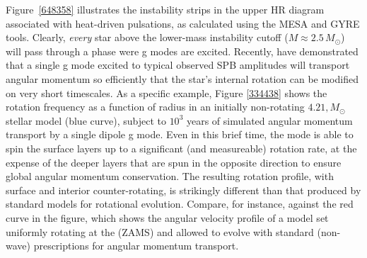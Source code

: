 Figure~\ref{648358} illustrates the instability strips in the upper HR diagram associated with heat-driven pulsations, as calculated using the MESA and GYRE tools. Clearly, \emph{every} star above the lower-mass instability cutoff ($M \approx 2.5\,M_{\odot}$) will pass through a phase were g modes are excited. Recently, \citet{Townsend:2017} have demonstrated that a single g mode excited to typical observed SPB amplitudes will transport angular momentum so efficiently that the star's internal rotation can be modified on very short timescales. As a specific example, Figure \ref{334438} shows the rotation frequency as a function of radius in an initially non-rotating $4.21,M_{\odot}$ stellar model (blue curve), subject to $10^3$ years of simulated angular momentum transport by a single dipole g mode. Even in this brief time, the mode is able to spin the surface layers up to a significant (and measureable) rotation rate, at the expense of the deeper layers that are spun in the opposite direction to ensure global angular momentum conservation. The resulting rotation profile, with surface and interior counter-rotating, is strikingly different than that produced by standard models for rotational evolution. Compare, for instance, against the red curve in the figure, which shows the angular velocity profile of a model set uniformly rotating at the (ZAMS) and allowed to evolve with standard (non-wave) prescriptions for angular momentum transport.


